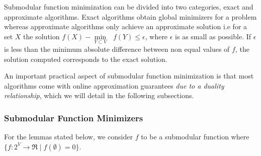 Submodular function minimization can be divided into two categories, exact and approximate algorithms. Exact algorithms obtain global minimizers for a problem whereas approximate algorithms only achieve an approximate solution i.e for a set $X$ the solution $f(X) - \underset{Y \subset V}{\operatorname{min }}\text{ } f(Y) \leq \epsilon $, where $\epsilon$ is as small as possible. If $\epsilon$ is less than the minimum absolute difference between non equal values of $f$, the solution computed corresponds to the exact solution.

An important practical aspect of submodular function minimization is that most algorithms come with online approximation guarantees {\it due to a duality relationship}, which we will detail in the following subsections.\\

\subsubsection{\bf Submodular Function Minimizers}
For the lemmas stated below, we consider $f$ to be a submodular function where $\{f:2^V \rightarrow \Re \mid f(\emptyset) = 0\}$.\\

